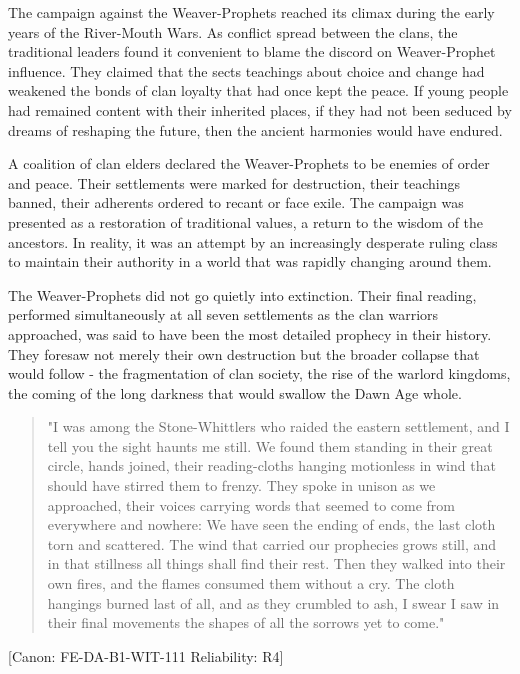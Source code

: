 The campaign against the Weaver-Prophets reached its climax during the
early years of the River-Mouth Wars. As conflict spread between the
clans, the traditional leaders found it convenient to blame the discord
on Weaver-Prophet influence. They claimed that the
sect\textquotesingle s teachings about choice and change had weakened
the bonds of clan loyalty that had once kept the peace. If young people
had remained content with their inherited places, if they had not been
seduced by dreams of reshaping the future, then the ancient harmonies
would have endured.

A coalition of clan elders declared the Weaver-Prophets to be enemies of
order and peace. Their settlements were marked for destruction, their
teachings banned, their adherents ordered to recant or face exile. The
campaign was presented as a restoration of traditional values, a return
to the wisdom of the ancestors. In reality, it was an attempt by an
increasingly desperate ruling class to maintain their authority in a
world that was rapidly changing around them.

The Weaver-Prophets did not go quietly into extinction. Their final
reading, performed simultaneously at all seven settlements as the clan
warriors approached, was said to have been the most detailed prophecy in
their history. They foresaw not merely their own destruction but the
broader collapse that would follow - the fragmentation of clan society,
the rise of the warlord kingdoms, the coming of the long darkness that
would swallow the Dawn Age whole.

\begin{quote}
"I was among the Stone-Whittlers who raided the eastern settlement, and
I tell you the sight haunts me still. We found them standing in their
great circle, hands joined, their reading-cloths hanging motionless in
wind that should have stirred them to frenzy. They spoke in unison as we
approached, their voices carrying words that seemed to come from
everywhere and nowhere: \textquotesingle We have seen the ending of
ends, the last cloth torn and scattered. The wind that carried our
prophecies grows still, and in that stillness all things shall find
their rest.\textquotesingle{} Then they walked into their own fires, and
the flames consumed them without a cry. The cloth hangings burned last
of all, and as they crumbled to ash, I swear I saw in their final
movements the shapes of all the sorrows yet to come."
\end{quote}

{[}Canon: FE-DA-B1-WIT-111 \textbar{} Reliability: R4{]}

